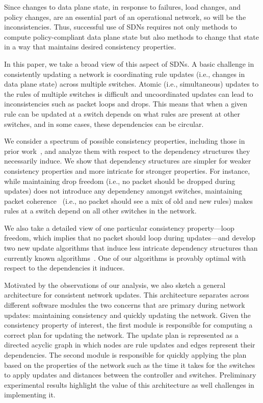 Since changes to data plane state, in response to failures, load changes, and policy changes, are an essential part of an operational network, so will be the inconsistencies. Thus, successful use of SDNs requires not only methods to compute policy-compliant data plane state but also methods to change that state in a way that maintains desired consistency properties.


In this paper, we take a broad view of this aspect of SDNs. A basic challenge in consistently updating a network is coordinating rule updates (i.e., changes in data plane state) across multiple switches.  Atomic (i.e., simultaneous) updates to the rules of multiple switches is difficult and uncoordinated updates can lead to inconsistencies such as packet loops and drops. This means that when a given rule can be updated at a switch depends on what rules are present at other switches, and in some cases, these dependencies can be circular.

We consider a spectrum of possible consistency properties, including those in prior work~\cite{safeupdate,swan}, and analyze them with respect to the dependency structures they necessarily induce. 
We show that dependency structures are simpler for weaker consistency properties and more intricate for stronger properties.  For instance, while maintaining drop freedom (i.e., no packet should be dropped during updates) does not introduce any dependency amongst switches, maintaining packet coherence~\cite{safeupdates} (i.e., no packet should see a mix of old and new rules) makes rules at a switch depend on all other switches in the network.  

We also take a detailed view of one particular consistency property---loop freedom, which implies that  no packet should loop during updates---and develop two new update algorithms that induce less intricate dependency structures than currently known algorithms~\cite{safeupdate}. One of our algorithms is provably  optimal with respect to the dependencies it induces.

Motivated by the observations of our analysis, we also sketch a general architecture for consistent network updates. This architecture separates across different software modules the two concerns that are primary during network updates: maintaining  consistency and quickly updating the network. Given the consistency property of interest, the first module is responsible for computing a correct plan for updating the network. The update plan is represented as a directed acyclic graph in which nodes are rule updates and edges represent their dependencies.  The second module is responsible for quickly applying the plan based on the properties of the network such as the time it takes for the switches to apply updates and distances between the controller and switches. Preliminary experimental results highlight the value of this architecture as well challenges in implementing it. 
